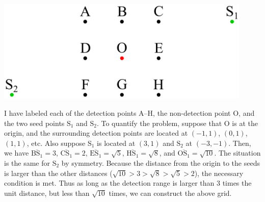 \documentclass{article}
\begin{document}
\vspace{0.1in}
\begin{center}
\includegraphics[width=4.8in]{seed_diagram.png}
\end{center}
\vspace{0.1in}

I have labeled each of the detection points A--H, the non-detection point O, and the two seed points $\mathrm{S}_{1}$ and $\mathrm{S}_{2}$.
To quantify the problem, suppose that O is at the origin, and the surrounding detection points are located at $(-1,1)$, $(0,1)$, $(1,1)$, etc.
Also suppose $\mathrm{S}_{1}$ is located at $(3,1)$ and $\mathrm{S}_{2}$ at $(-3,-1)$.
Then, we have $\overline{\mathrm{BS}_{1}}=3$, $\overline{\mathrm{CS}_{1}}=2$, $\overline{\mathrm{ES}_{1}}=\sqrt{5}$, $\overline{\mathrm{HS}_{1}}=\sqrt{8}$, and $\overline{\mathrm{OS}_{1}}=\sqrt{10}$.
The situation is the same for $\mathrm{S}_{2}$ by symmetry.
Because the distance from the origin to the seeds is larger than the other distances ($\sqrt{10}>3>\sqrt{8}>\sqrt{5}>2$), the necessary condition is met.
Thus as long as the detection range is larger than 3 times the unit distance, but less than $\sqrt{10}$ times, we can construct the above grid. 
\end{document}
